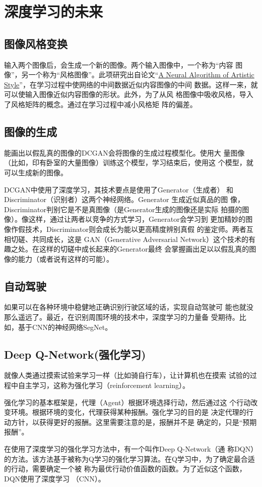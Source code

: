\section{深度学习的未来}
\subsection{图像风格变换}
输入两个图像后，会生成一个新的图像。两个输入图像中，一个称为“内容
图像”，另一个称为“风格图像”。此项研究出自论文“\href{https://arxiv.org/abs/1508.06576}{A Neural Algorithm of Artistic Style}”，在学习过程中使网络的中间数据近似内容图像的中间
数据。这样一来，就可以使输入图像近似内容图像的形状。此外，为了从风
格图像中吸收风格，导入了风格矩阵的概念。通过在学习过程中减小风格矩
阵的偏差。
\subsection{图像的生成}
能画出以假乱真的图像的DCGAN会将图像的生成过程模型化。使用大
量图像（比如，印有卧室的大量图像）训练这个模型，学习结束后，使用这
个模型，就可以生成新的图像。

DCGAN中使用了深度学习，其技术要点是使用了Generator（生成者）
和 Discriminator（识别者）这两个神经网络。Generator 生成近似真品的图
像，Discriminator判别它是不是真图像（是Generator生成的图像还是实际
拍摄的图像）。像这样，通过让两者以竞争的方式学习，Generator会学习到
更加精妙的图像作假技术，Discriminator则会成长为能以更高精度辨别真假
的鉴定师。两者互相切磋、共同成长，这是 GAN（Generative Adversarial
Network）这个技术的有趣之处。在这样的切磋中成长起来的Generator最终
会掌握画出足以以假乱真的图像的能力（或者说有这样的可能）。
\subsection{自动驾驶}
如果可以在各种环境中稳健地正确识别行驶区域的话，实现自动驾驶可
能也就没那么遥远了。最近，在识别周围环境的技术中，深度学习的力量备
受期待。比如，基于CNN的神经网络SegNet。
\subsection{Deep Q-Network(强化学习)}
就像人类通过摸索试验来学习一样（比如骑自行车），让计算机也在摸索
试验的过程中自主学习，这称为强化学习（reinforcement learning）。

强化学习的基本框架是，代理（Agent）根据环境选择行动，然后通过这
个行动改变环境。根据环境的变化，代理获得某种报酬。强化学习的目的是
决定代理的行动方针，以获得更好的报酬。这里需要注意的是，报酬并不是
确定的，只是“预期报酬”。

在使用了深度学习的强化学习方法中，有一个叫作Deep Q-Network（通
称DQN）的方法。该方法基于被称为Q学习的强化学习算法。在Q学习中，为了确定最合适的行动，需要确定一个被
称为最优行动价值函数的函数。为了近似这个函数，DQN使用了深度学习
（CNN）。